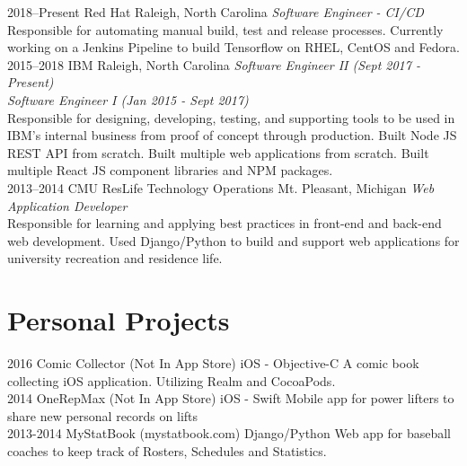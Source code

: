 \documentclass[]{friggeri-cv} %
\begin{document}
\begin{entrylist}
\entry
{2018--Present}
{Red Hat}
{Raleigh, North Carolina}
{\emph{Software Engineer - CI/CD} \\
Responsible for automating manual build, test and release processes. Currently working on a Jenkins Pipeline to build Tensorflow on RHEL, CentOS and Fedora.}\\

\entry
{2015--2018}
{IBM}
{Raleigh, North Carolina}
{\emph{Software Engineer II (Sept 2017 - Present)} \\
\emph{Software Engineer I (Jan 2015 - Sept 2017)} \\
Responsible for designing, developing, testing, and supporting tools to be used in IBM's internal business from proof of concept through production.
Built Node JS REST API from scratch. Built multiple web applications from scratch. Built multiple React JS component libraries and NPM packages.}\\

\entry
{2013--2014}
{CMU ResLife Technology Operations}
{Mt. Pleasant, Michigan}
{\emph{Web Application Developer} \\
Responsible for learning and applying best practices in front-end and back-end web development. Used Django/Python to build and support web applications for university recreation and residence life.}\\

\end{entrylist}


\section{Personal Projects}

\begin{entrylist}
\entry
{2016}
{Comic Collector (Not In App Store)}
{iOS - Objective-C}
{A comic book collecting iOS application. Utilizing Realm and CocoaPods.}\\

\entry
{2014}
{OneRepMax (Not In App Store)}
{iOS - Swift}
{Mobile app for power lifters to share new personal records on lifts}\\

\entry
{2013-2014}
{MyStatBook (mystatbook.com)}
{Django/Python}
{Web app for baseball coaches to keep track of Rosters, Schedules and Statistics.}\\

\end{entrylist}
\end{document}
